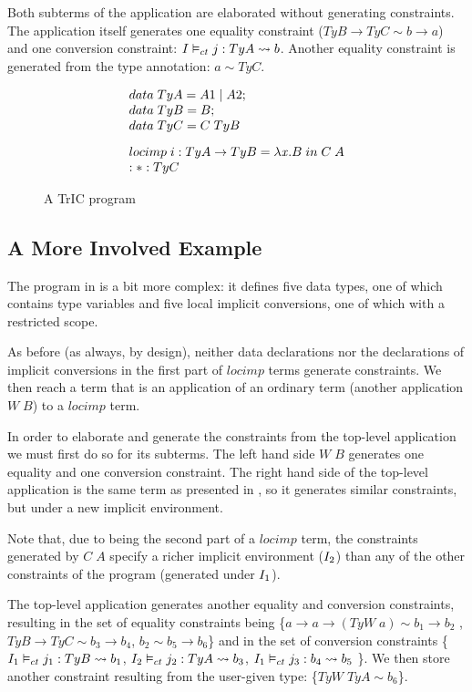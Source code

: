 Both subterms of the application are elaborated without generating constraints. The application itself generates one equality constraint ($TyB \to TyC \sim b \to a$) and one conversion constraint: ${I} \vDash_{ct} {j}: {TyA} \rightsquigarrow {b}$. Another equality constraint is generated from the type annotation: $a \sim TyC$.
\begin{figure}
     \[
\begin{array}{@{\hspace{0mm}}l@{\hspace{0mm}}}
  data\;TyA=A1\;|\;A2;\\
  data\;TyB=B;\\
  data\;TyC=C\;TyB\\[3mm]
  \monolocal{i}{TyA}{TyB}{\lambda \tmVar . B}{C\;A}\\
  :*: TyC
\end{array}
\]
\caption{A TrIC program}
\label{simple5}
\end{figure}
\subsection{A More Involved Example}
The program in  is a bit more complex: it defines five data types, one of which contains type variables and five local implicit conversions, one of which with a restricted scope.

As before (as always, by design), neither data declarations nor the declarations of implicit conversions in the first part of $locimp$ terms generate constraints. We then reach a term that is an application of an ordinary term (another application $W\;B$) to a $locimp$ term.

In order to elaborate and generate the constraints from the top-level application we must first do so for its subterms. The left hand side  $W\;B$ generates one equality and one conversion constraint. The right hand side of the top-level application is the same term as presented in , so it generates similar constraints, but under a new implicit environment.

Note that, due to being the second part of a $locimp$ term, the constraints generated by $C\;A$ specify a richer implicit environment ($I_2$) than any of the other constraints of the program (generated under $I_1$).

The top-level application generates another equality and conversion constraints, resulting in the set of equality constraints being \{$a \to a \to (TyW \; a) \sim b_1 \to b_2$ ,$TyB \to TyC \sim b_3 \to b_4$, $b_2 \sim b_5 \to b_6$\} and in the set of conversion constraints \{${I_1} \vDash_{ct} {j_1}: {TyB} \rightsquigarrow {b_1}$, ${I_2} \vDash_{ct} {j_2}: {TyA} \rightsquigarrow {b_3}$, ${I_1} \vDash_{ct} {j_3}: {b_4} \rightsquigarrow {b_5}$ \}. We then store another constraint resulting from the user-given type: \{$TyW \; TyA \sim b_6$\}.


